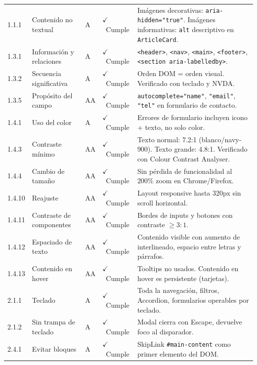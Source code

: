 \documentclass[12pt, a4paper]{report}
\newcommand{\cmark}{\textcolor{successgreen}{$\checkmark$}}
\begin{document}
\begin{longtable}{@{}>{\ttfamily\small}p{1.1cm} p{2.7cm} >{\centering\arraybackslash}p{0.8cm} >{\centering\arraybackslash\small}p{2.2cm} p{4.5cm}@{}}
1.1.1 & Contenido no textual & A & \textcolor{successgreen}{\cmark~Cumple} & Imágenes decorativas: \texttt{aria-hidden="true"}. Imágenes informativas: \texttt{alt} descriptivo en \texttt{ArticleCard}. \\
1.3.1 & Información y relaciones & A & \textcolor{successgreen}{\cmark~Cumple} & \texttt{<header>}, \texttt{<nav>}, \texttt{<main>}, \texttt{<footer>}, \texttt{<section aria-labelledby>}. \\
1.3.2 & Secuencia significativa & A & \textcolor{successgreen}{\cmark~Cumple} & Orden DOM = orden visual. Verificado con teclado y NVDA. \\
1.3.5 & Propósito del campo & AA & \textcolor{successgreen}{\cmark~Cumple} & \texttt{autocomplete="name"}, \texttt{"email"}, \texttt{"tel"} en formulario de contacto. \\
1.4.1 & Uso del color & A & \textcolor{successgreen}{\cmark~Cumple} & Errores de formulario incluyen icono + texto, no solo color. \\
1.4.3 & Contraste mínimo & AA & \textcolor{successgreen}{\cmark~Cumple} & Texto normal: 7.2:1 (blanco/navy-900). Texto grande: 4.8:1. Verificado con Colour Contrast Analyser. \\
1.4.4 & Cambio de tamaño & AA & \textcolor{successgreen}{\cmark~Cumple} & Sin pérdida de funcionalidad al 200\% zoom en Chrome/Firefox. \\
1.4.10 & Reajuste & AA & \textcolor{successgreen}{\cmark~Cumple} & Layout responsive hasta 320px sin scroll horizontal. \\
1.4.11 & Contraste de componentes & AA & \textcolor{successgreen}{\cmark~Cumple} & Bordes de inputs y botones con contraste $\geq 3:1$. \\
1.4.12 & Espaciado de texto & AA & \textcolor{successgreen}{\cmark~Cumple} & Contenido visible con aumento de interlineado, espacio entre letras y párrafos. \\
1.4.13 & Contenido en hover & AA & \textcolor{successgreen}{\cmark~Cumple} & Tooltips no usados. Contenido en hover es persistente (tarjetas). \\
2.1.1 & Teclado & A & \textcolor{successgreen}{\cmark~Cumple} & Toda la navegación, filtros, Accordion, formularios operables por teclado. \\
2.1.2 & Sin trampa de teclado & A & \textcolor{successgreen}{\cmark~Cumple} & Modal cierra con Escape, devuelve foco al disparador. \\
2.4.1 & Evitar bloques & A & \textcolor{successgreen}{\cmark~Cumple} & SkipLink \texttt{\#main-content} como primer elemento del DOM. \\

\end{longtable}
\end{document}

